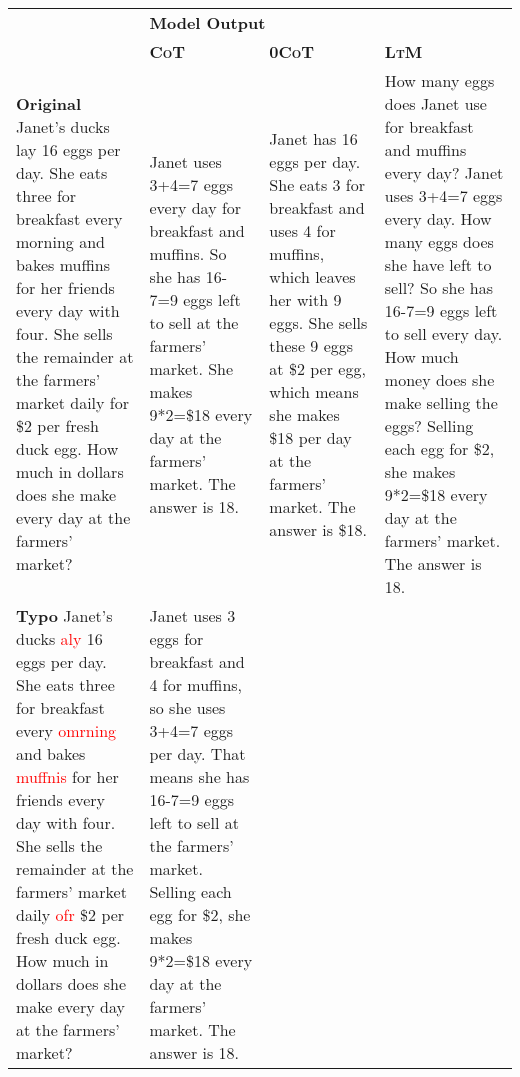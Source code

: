 \documentclass[11pt]{article}
\begin{document}
\begin{center}
\small
\renewcommand{\arraystretch}{1.5}
\begin{longtable}{| p{3.8cm} | p{3.2cm} | p{3.2cm} | p{4.1cm} |}
    \hline\label{table:exemp}\multirow{2}{*}{\hspace{0.8cm}\textbf{Input Question}}  & \multicolumn{3}{p{11.2cm}|}{\textbf{\hspace{4.5cm} Model Output}} \\ \cline{2-4}
    &
    \textbf{\hspace{1.3cm}\textsc{CoT}} & \textbf{\hspace{1.3cm}\textsc{0CoT}} & \textbf{\hspace{1.5cm}\textsc{LtM}} \\ \hline
    \textbf{Original} \newline
    Janet's ducks lay 16 eggs per day. She eats three for breakfast every morning and bakes muffins for her friends every day with four. She sells the remainder at the farmers' market daily for \$2 per fresh duck egg. How much in dollars does she make every day at the farmers' market?
    &
    \newline Janet uses 3+4=7 eggs every day for breakfast and muffins. So she has 16-7=9 eggs left to sell at the farmers' market. She makes 9*2=\$18 every day at the farmers' market. The answer is 18.
    &
    \newline Janet has 16 eggs per day. She eats 3 for breakfast and uses 4 for muffins, which leaves her with 9 eggs. She sells these 9 eggs at \$2 per egg, which means she makes \$18 per day at the farmers' market. The answer is \$18.
    &
    \newline How many eggs does Janet use for breakfast and muffins every day? Janet uses 3+4=7 eggs every day. How many eggs does she have left to sell? So she has 16-7=9 eggs left to sell every day. How much money does she make selling the eggs? Selling each egg for \$2, she makes 9*2=\$18 every day at the farmers' market. The answer is 18.
    \\
    \hline
    \textbf{Typo} \newline
    Janet's ducks \textcolor{red}{aly} 16 eggs per day. She eats three for breakfast every \textcolor{red}{omrning} and bakes \textcolor{red}{muffnis} for her friends every day with four. She sells the remainder at the farmers' market daily \textcolor{red}{ofr} \$2 per fresh duck egg. How much in dollars does she make every day at the farmers' market?
    &
    \newline Janet uses 3 eggs for breakfast and 4 for muffins, so she uses 3+4=7 eggs per day. That means she has 16-7=9 eggs left to sell at the farmers' market. Selling each egg for \$2, she makes 9*2=\$18 every day at the farmers' market. The answer is 18.

\end{longtable}
\end{center}
\end{document}
